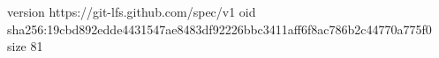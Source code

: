 version https://git-lfs.github.com/spec/v1
oid sha256:19cbd892edde4431547ae8483df92226bbc3411aff6f8ac786b2c44770a775f0
size 81
